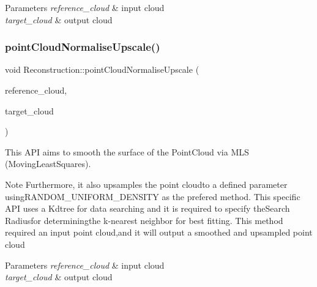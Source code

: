 \begin{DoxyParams}{Parameters}
{\em reference\+\_\+cloud} & input cloud \\
\hline
{\em target\+\_\+cloud} & output cloud \\
\hline
\end{DoxyParams}
\mbox{\label{classReconstruction_ad5749b9529d6f026ae9bb1084f63b276}} 
\subsubsection{\texorpdfstring{point\+Cloud\+Normalise\+Upscale()}{pointCloudNormaliseUpscale()}}
{\footnotesize\ttfamily void Reconstruction\+::point\+Cloud\+Normalise\+Upscale (\begin{DoxyParamCaption}\item[{pcl\+::\+Point\+Cloud$<$ pcl\+::\+Point\+X\+Y\+Z\+R\+G\+B\+Normal $>$\+::Ptr \&}]{reference\+\_\+cloud,  }\item[{pcl\+::\+Point\+Cloud$<$ pcl\+::\+Point\+X\+Y\+Z\+R\+G\+B\+Normal $>$\+::Ptr \&}]{target\+\_\+cloud }\end{DoxyParamCaption})}



This A\+PI aims to smooth the surface of the Point\+Cloud via M\+LS (Moving\+Least\+Squares). 

\begin{DoxyNote}{Note}
Furthermore, it also upsamples the point cloudto a defined parameter using\+R\+A\+N\+D\+O\+M\+\_\+\+U\+N\+I\+F\+O\+R\+M\+\_\+\+D\+E\+N\+S\+I\+TY as the prefered method. This specific A\+PI uses a Kdtree for data searching and it is required to specify the\+Search Radiusfor determiningthe k-\/nearest neighbor for best fitting. This method required an input point cloud,and it will output a smoothed and upsampled point cloud
\end{DoxyNote}

\begin{DoxyParams}{Parameters}
{\em reference\+\_\+cloud} & input cloud \\
\hline
{\em target\+\_\+cloud} & output cloud \\
\hline
\end{DoxyParams}
\mbox{\label{classReconstruction_aab58cb52a7507ed64640c5e6645f296e}} 
